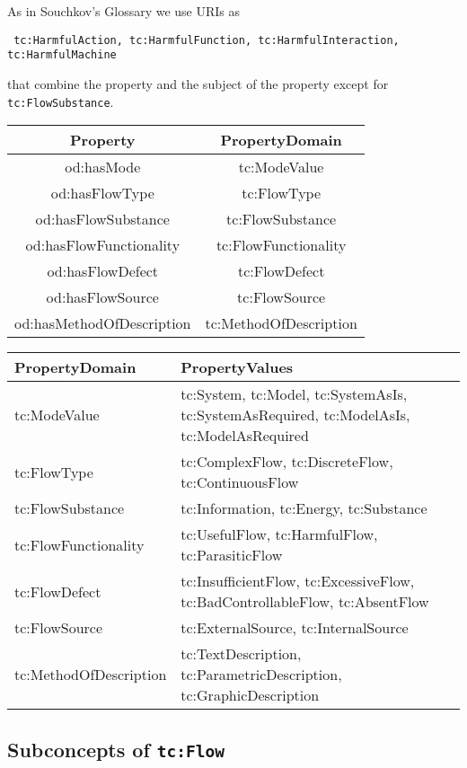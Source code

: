 \documentclass[11pt,a4paper]{article}
\begin{document}
As in Souchkov's Glossary we use URIs as 
\begin{center}\tt
  tc:HarmfulAction, tc:HarmfulFunction, tc:HarmfulInteraction,
  tc:HarmfulMachine
\end{center}
that combine the property and the subject of the property except for
\texttt{tc:FlowSubstance}.

\begin{center}
  \begin{tabular}{|c|c|}\hline
    Property & PropertyDomain \\\hline
    od:hasMode & tc:ModeValue \\
    od:hasFlowType & tc:FlowType  \\
    od:hasFlowSubstance & tc:FlowSubstance  \\
    od:hasFlowFunctionality & tc:FlowFunctionality  \\
    od:hasFlowDefect & tc:FlowDefect  \\
    od:hasFlowSource & tc:FlowSource  \\
    od:hasMethodOfDescription & tc:MethodOfDescription \\\hline 
  \end{tabular}
\end{center}

\begin{center}
  \begin{tabular}{|l|p{10cm}|}\hline
    PropertyDomain & PropertyValues \\\hline
    tc:ModeValue & tc:System, tc:Model, tc:SystemAsIs, tc:SystemAsRequired,
    tc:ModelAsIs, tc:ModelAsRequired \\
    tc:FlowType & tc:ComplexFlow, tc:DiscreteFlow, tc:ContinuousFlow \\
    tc:FlowSubstance & tc:Information, tc:Energy, tc:Substance \\
    tc:FlowFunctionality & tc:UsefulFlow, tc:HarmfulFlow, tc:ParasiticFlow  \\
    tc:FlowDefect & tc:InsufficientFlow, tc:ExcessiveFlow,
    tc:BadControllableFlow, tc:AbsentFlow \\ 
    tc:FlowSource & tc:ExternalSource, tc:InternalSource  \\
    tc:MethodOfDescription & tc:TextDescription, tc:ParametricDescription,
    tc:GraphicDescription \\\hline 
  \end{tabular}
\end{center}

\subsection{Subconcepts of \texttt{tc:Flow}}
\end{document}

